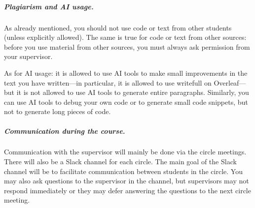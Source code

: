 \documentclass[report,english,cleveref,autoref,a4paper]{lipics-v2021}
\begin{document}
\subparagraph{Plagiarism and AI usage.}
As already mentioned, you should not use code or text from other students
(unless explicitly allowed). The same is true for code or text from other sources:
before you use material from other sources, you must always ask permission from your supervisor.

As for AI usage: it is allowed to use AI tools to make small improvements in
the text you have written---in particular, it is allowed to use {\sc writefull} on
Overleaf---but it is not allowed to use AI tools to generate entire paragraphs.
Similarly, you can use AI tools to debug your own code or to generate small code snippets,
but not to generate long pieces of code.

\subparagraph{Communication during the course.}
Communication with the supervisor will mainly be done via the circle meetings.
There will also be a Slack channel for each circle. The main goal of the 
Slack channel will be to facilitate communication between students in the circle.
You may also ask questions to the supervisor in the channel, but supervisors
may not respond immediately or they may defer answering the questions to the
next circle meeting.
\end{document}
